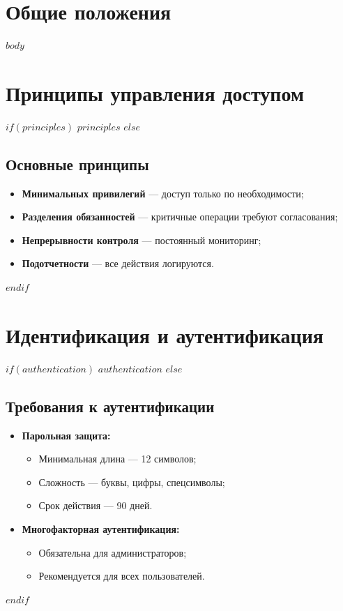 \documentclass[14pt,a4paper]{extarticle}
\begin{document}
\makeTitlePage

\mainpagestyle
\tableofcontents
\newpage

\section{Общие положения}
\label{sec:general}

$body$

\section{Принципы управления доступом}
\label{sec:principles}

$if(principles)$
$principles$
$else$
\subsection{Основные принципы}
\begin{itemize}
    \item \textbf{Минимальных привилегий} — доступ только по необходимости;
    \item \textbf{Разделения обязанностей} — критичные операции требуют согласования;
    \item \textbf{Непрерывности контроля} — постоянный мониторинг;
    \item \textbf{Подотчетности} — все действия логируются.
\end{itemize}
$endif$

\section{Идентификация и аутентификация}
\label{sec:authentication}

$if(authentication)$
$authentication$
$else$
\subsection{Требования к аутентификации}
\begin{itemize}
    \item \textbf{Парольная защита:}
    \begin{itemize}
        \item Минимальная длина — 12 символов;
        \item Сложность — буквы, цифры, спецсимволы;
        \item Срок действия — 90 дней.
    \end{itemize}
    
    \item \textbf{Многофакторная аутентификация:}
    \begin{itemize}
        \item Обязательна для администраторов;
        \item Рекомендуется для всех пользователей.
    \end{itemize}
\end{itemize}
$endif$
\end{document}
